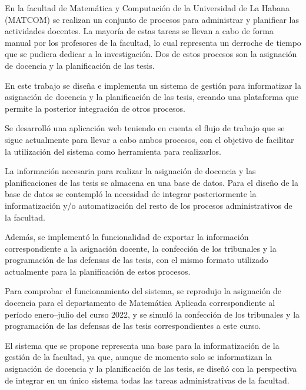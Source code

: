 \begin{conclusions}
    En la facultad de Matemática y Computación de la Universidad de La Habana (MATCOM)
se realizan un conjunto de procesos para administrar y planificar las actividades docentes. 
La mayoría de estas tareas se llevan a cabo de forma manual por los profesores de la facultad, lo cual representa
un derroche de tiempo que se pudiera dedicar a la investigación.
Dos de estos procesos son la asignación de docencia y la planificación de las tesis. 

En este trabajo se diseña e implementa un sistema de gestión para informatizar 
la asignación de docencia y la planificación de las tesis, creando una plataforma que permite 
la posterior integración de otros procesos.

    
Se desarrolló una aplicación web teniendo en cuenta el flujo de trabajo que se sigue actualmente para 
llevar a cabo ambos procesos, con el objetivo de facilitar la utilización del sistema como herramienta
para realizarlos.

La información necesaria para realizar la asignación de docencia y 
las planificaciones de las tesis  
se almacena en una base de datos.
Para el diseño de la base de datos se contempló la necesidad de integrar 
posteriormente la informatización y/o automatización del resto de los procesos 
administrativos de la facultad.

Además, se implementó la funcionalidad de exportar la
información correspondiente a la asignación docente,
la confección de los tribunales y la programación de las defensas de las tesis, 
con el mismo formato utilizado actualmente para la planificación de estos procesos.


Para comprobar el funcionamiento del sistema,
se reprodujo la asignación de docencia para el departamento 
de Matemática Aplicada correspondiente al período 
enero--julio del curso 2022, y se simuló la confección de los tribunales 
y la programación de las defensas de las tesis correspondientes
a este curso. 

El sistema que se propone representa una base para la informatización de la gestión de la facultad,
ya que, aunque de momento solo se informatizan la asignación de docencia
y la planificación de las tesis, se diseñó
con la perspectiva de integrar en un único sistema todas las tareas
administrativas de la facultad.


\end{conclusions}
